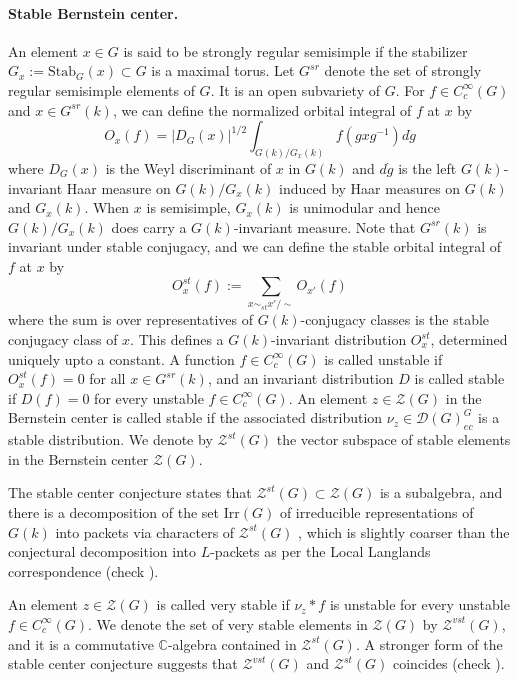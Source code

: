 \documentclass[11 pt]{article}
\numberwithin{equation}{subsection}
\theoremstyle{definition}
\theoremstyle{remark}
\theoremstyle{conjecture}
\newcommand{\Irr}{\mathrm{Irr}}
\newcommand{\C}{\mathbb C}
\newcommand{\ZZ}{\mathcal{Z}}
\newcommand{\mc}{\mathcal}
\begin{document}
\paragraph{Stable Bernstein center.}  An element $x \in G$ is said to be strongly regular semisimple if the stabilizer $G_x:= \mathrm{Stab}_G(x) \subset G$ is a maximal torus. Let $G^{sr}$ denote the set of strongly regular semisimple elements of $G$. It is an open subvariety of $G$. For $f \in C_c^\infty(G)$ and $x \in G^{sr}(k)$, we can define the normalized orbital integral of $f$ at $x$ by 
\begin{equation*}
    O_x(f)= |D_G(x)|^{1/2} \int_{G(k)/G_x(k)} f(gxg^{-1})d\dot g
\end{equation*}
where $D_G(x)$ is the Weyl discriminant of $x$ in $G(k)$ and $d\dot g$ is the left $G(k)$-invariant Haar measure on $G(k)/G_x(k)$ induced by Haar measures on $G(k)$ and $G_x(k)$. When $x$ is semisimple, $G_x(k)$ is unimodular and hence $G(k)/G_x(k)$ does carry a $G(k)$-invariant measure. Note that $G^{sr}(k)$ is invariant under stable conjugacy, and we can define the stable orbital integral of $f$ at $x$ by 
\begin{equation*}
    O^{st}_x(f):=\sum_{x \sim_{st}x'/\sim}O_{x'}(f)
\end{equation*}
where the sum is over representatives of $G(k)$-conjugacy classes is the stable conjugacy class of $x$. This defines a $G(k)$-invariant distribution $O^{st}_x$, determined uniquely upto a constant. A function $f \in C^\infty_c(G)$ is called unstable if $O_x^{st}(f)=0$ for all $x \in G^{sr}(k)$, and an invariant distribution $D$ is called stable if $D(f)=0$ for every unstable $f \in C^\infty_c(G)$. An element $z \in \ZZ(G)$ in the Bernstein center is called stable if the associated distribution $\nu_z \in \mc D(G)^G_{ec}$ is a stable distribution. We denote by $\ZZ^{st}(G)$ the vector subspace of stable elements in the Bernstein center $\ZZ(G)$. \par The stable center conjecture states that $\ZZ^{st}(G)\subset \ZZ(G)$ is a subalgebra, and there is a decomposition of the set $\Irr(G)$ of irreducible representations of $G(k)$ into packets via characters of $\ZZ^{st}(G)$ , which is slightly coarser than the conjectural decomposition into $L$-packets as per the Local Langlands correspondence (check \cite[Section 3.1.4]{BKV}). \par
An element $z \in \ZZ(G)$ is called very stable if $\nu_z*f$ is unstable for every unstable $f \in C_c^\infty(G)$. We denote the set of very stable elements in $\ZZ(G)$ by $\ZZ^{vst}(G)$, and it is a commutative $\C$-algebra contained in $\ZZ^{st}(G)$. A stronger form of the stable center conjecture suggests that $\ZZ^{vst}(G)$ and $\ZZ^{st}(G)$ coincides (check \cite[Section 1.1]{hansen2025excursion}). 
\end{document}
